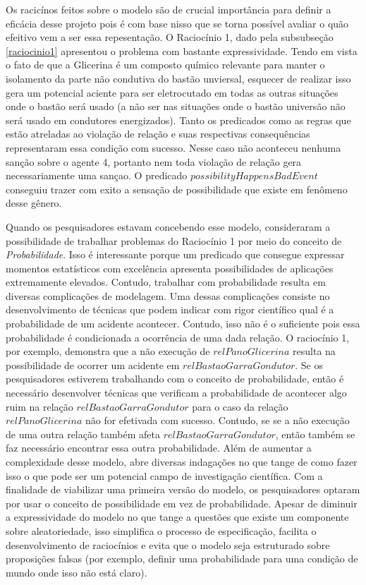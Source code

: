 Os racicínos feitos sobre o modelo são de crucial importância para definir a eficácia desse projeto pois é com base nisso que se torna possível avaliar o quão 
efeitivo vem a ser essa repesentação. O Raciocínio 1, dado pela subsubseção \ref{raciocinio1} apresentou o problema com bastante expressividade. Tendo em vista o fato de que a Glicerina 
é um composto químico relevante para manter o isolamento da parte não condutiva do bastão unviersal, esquecer de realizar isso gera um potencial aciente para ser eletrocutado em todas 
as outras situações onde o bastão será usado (a não ser nas situações onde o bastão universão não será usado em condutores energizados). Tanto os predicados como as regras que estão
atreladas ao violação de relação e suas respectivas consequências representaram essa condição com sucesso. Nesse caso não aconteceu nenhuma sanção sobre o agente 4, portanto nem toda 
violação de relação gera necessariamente uma sançao. O predicado $possibilityHappensBadEvent$ conseguiu trazer com exito a sensação de possibilidade que existe em fenômeno desse gênero. 

Quando os pesquisadores estavam concebendo esse modelo, consideraram a possibilidade de trabalhar problemas do Raciocínio 1 por meio do conceito de \textit{Probabilidade}. Isso é interessante 
porque um predicado que consegue expressar momentos estatísticos com excelência apresenta possibilidades de aplicações extremamente elevados. Contudo, trabalhar com probabilidade resulta 
em diversas complicações de modelagem. Uma dessas complicações consiste no desenvolvimento de técnicas que podem indicar com rigor científico qual é a probabilidade de um acidente acontecer. 
Contudo, isso não é o suficiente pois essa probabilidade é condicionada a ocorrência de uma dada relação. O raciocínio 1, por exemplo, demonstra que a não execução de $relPanoGlicerina$ resulta 
na possibilidade de ocorrer um acidente em $relBastaoGarraGondutor$. Se os pesquisadores estiverem trabalhando com o conceito de probabilidade, então é necessário desenvolver técnicas que 
verificam a probabilidade de acontecer algo ruim na relação $relBastaoGarraGondutor$ para o caso da relação $relPanoGlicerina$ não for efetivada com sucesso. Contudo, se se a não execução de uma 
outra relação também afeta $relBastaoGarraGondutor$, então também se faz necessário encontrar essa outra probabilidade. Além de aumentar a complexidade desse modelo, abre diversas indagações 
no que tange de como fazer isso o que pode ser um potencial campo de investigação científica. Com a finalidade de viabilizar uma primeira versão do modelo, os pesquisadores optaram por 
usar o conceito de possibilidade em vez de probabilidade. Apesar de diminuir a expressividade do modelo no que tange a questões que existe um componente sobre aleatoriedade, isso simplifica 
o processo de especificação, facilita o desenvolvimento de raciocínios e evita que o modelo seja estruturado sobre proposições falsas (por exemplo, definir uma probabilidade para uma condição 
de mundo onde isso não está claro). 

